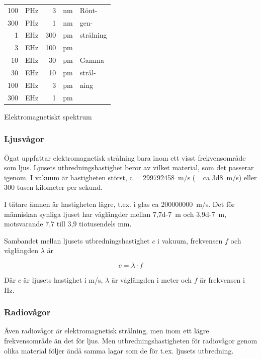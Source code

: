 \begin{margintable}
\begin{center}
\begin{tabular}{|rl|rl|l|}
100 & PHz &   3 & nm & Rönt-\\
300 & PHz &   1 & nm & gen-\\
  1 & EHz & 300 & pm & strålning\\ \cline{5-5}
  3 & EHz & 100 & pm & \\
 10 & EHz &  30 & pm & Gamma-\\
 30 & EHz &  10 & pm & strål-\\
100 & EHz &   3 & pm & ning\\
300 & EHz &   1 & pm & \\
\hline
\end{tabular}
\end{center}
\caption{Elektromagnetiskt spektrum}
\label{tab:elektromagnetiskt_spektrum}
\end{margintable}

\subsubsection{Ljusvågor}

Ögat uppfattar elektromagnetisk strålning bara inom ett visst frekvensområde
som ljus.
Ljusets utbredningshastighet beror av vilket material, som det passerar igenom.
I vakuum är hastigheten störst, c = \SI{299792458}{m/s}
(= ca \SI{3d8}{m/s}) eller 300 tusen kilometer per sekund\cite{SIbrochure8}.

I tätare ämnen är hastigheten lägre, t.ex. i glas ca \SI{200000000}{m/s}.
Det för människan synliga ljuset har våglängder mellan \SI{7,7d-7}{m}
och \SI{3,9d-7}{m}, motsvarande 7,7 till 3,9 tiotusendels mm.

Sambandet mellan ljusets utbredningshastighet \(c\) i vakuum, frekvensen \(f\)
och våglängden \(\lambda\) är

\[
c = \lambda \cdot f 
\]

Där $c$ är ljusets hastighet i m/s, $\lambda$ är våglängden i meter
och $f$ är frekvensen i Hz.

\subsubsection{Radiovågor}

Även radiovågor är elektromagnetisk strålning, men inom ett lägre
frekvensområde än det för ljus.
Men utbredningshastigheten för radiovågor genom olika material följer ändå
samma lagar som de för t.ex. ljusets utbredning.

